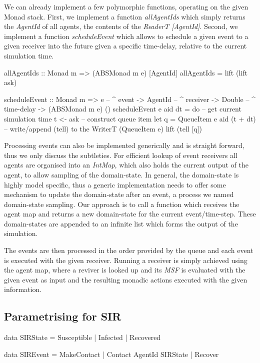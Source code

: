 We can already implement a few polymorphic functions, operating on the given Monad stack. First, we implement a function \textit{allAgentIds} which simply returns the \textit{AgentId} of all agents, the contents of the \textit{ReaderT [AgentId]}. Second, we implement a function \textit{scheduleEvent} which allows to schedule a given event to a given receiver into the future given a specific time-delay, relative to the current simulation time.
 
\begin{HaskellCode}
allAgentIds :: Monad m => (ABSMonad m e) [AgentId]
allAgentIds = lift (lift ask)

scheduleEvent :: Monad m
              => e                 -- ^ event
              -> AgentId           -- ^ receiver
              -> Double            -- ^ time-delay
              -> (ABSMonad m e) ()
scheduleEvent e aid dt = do
  -- get current simulation time
  t <- ask
  -- construct queue item
  let q = QueueItem e aid (t + dt)
  -- write/append (tell) to the WriterT (QueueItem e)
  lift (tell [q])
\end{HaskellCode}

Processing events can also be implemented generically and is straight forward, thus we only discuss the subtleties. For efficient lookup of event receivers all agents are organised into an \textit{IntMap}, which also holds the current output of the agent, to allow sampling of the domain-state. In general, the domain-state is highly model specific, thus a generic implementation needs to offer some mechanism to update the domain-state after an event, a process we named domain-state sampling. Our approach is to call a function which receives the agent map and returns a new domain-state for the current event/time-step. These domain-states are appended to an infinite list which forms the output of the simulation.

The events are then processed in the order provided by the queue and each event is executed with the given receiver. Running a receiver is simply achieved using the agent map, where a reviver is looked up and its \textit{MSF} is evaluated with the given event as input and the resulting monadic actions executed with the given information.
 
\subsection{Parametrising for SIR}

\begin{HaskellCode}
data SIRState
  = Susceptible
  | Infected
  | Recovered
  
data SIREvent 
  = MakeContact
  | Contact AgentId SIRState
  | Recover 
\end{HaskellCode}

